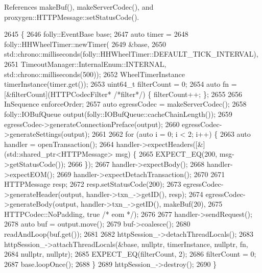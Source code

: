 References make\+Buf(), make\+Server\+Codec(), and proxygen\+::\+H\+T\+T\+P\+Message\+::set\+Status\+Code().


\begin{DoxyCode}
2645                                                \{
2646   folly::EventBase base;
2647   \textcolor{keyword}{auto} timer =
2648     folly::HHWheelTimer::newTimer(
2649       &base,
2650       std::chrono::milliseconds(folly::HHWheelTimer::DEFAULT\_TICK\_INTERVAL),
2651       TimeoutManager::InternalEnum::INTERNAL, std::chrono::milliseconds(500));
2652   WheelTimerInstance timerInstance(timer.get());
2653   uint64\_t filterCount = 0;
2654   \textcolor{keyword}{auto} fn = [&filterCount](HTTPCodecFilter* \textcolor{comment}{/*filter*/}) \{ filterCount++; \};
2655 
2656   InSequence enforceOrder;
2657   \textcolor{keyword}{auto} egressCodec = makeServerCodec();
2658   folly::IOBufQueue output(folly::IOBufQueue::cacheChainLength());
2659   egressCodec->generateConnectionPreface(output);
2660   egressCodec->generateSettings(output);
2661 
2662   \textcolor{keywordflow}{for} (\textcolor{keyword}{auto} i = 0; i < 2; i++) \{
2663     \textcolor{keyword}{auto} handler = openTransaction();
2664     handler->expectHeaders([&] (std::shared\_ptr<HTTPMessage> msg) \{
2665         EXPECT\_EQ(200, msg->getStatusCode());
2666       \});
2667     handler->expectBody();
2668     handler->expectEOM();
2669     handler->expectDetachTransaction();
2670 
2671     HTTPMessage resp;
2672     resp.setStatusCode(200);
2673     egressCodec->generateHeader(output, handler->txn\_->getID(), resp);
2674     egressCodec->generateBody(output, handler->txn\_->getID(), makeBuf(20),
2675                               HTTPCodec::NoPadding, \textcolor{keyword}{true} \textcolor{comment}{/* eom */});
2676 
2677     handler->sendRequest();
2678     \textcolor{keyword}{auto} buf = output.move();
2679     buf->coalesce();
2680     readAndLoop(buf.get());
2681 
2682     httpSession\_->detachThreadLocals();
2683     httpSession\_->attachThreadLocals(&base, \textcolor{keyword}{nullptr}, timerInstance, \textcolor{keyword}{nullptr}, fn,
2684                                      \textcolor{keyword}{nullptr}, \textcolor{keyword}{nullptr});
2685     EXPECT\_EQ(filterCount, 2);
2686     filterCount = 0;
2687     base.loopOnce();
2688   \}
2689   httpSession\_->destroy();
2690 \}
\end{DoxyCode}
